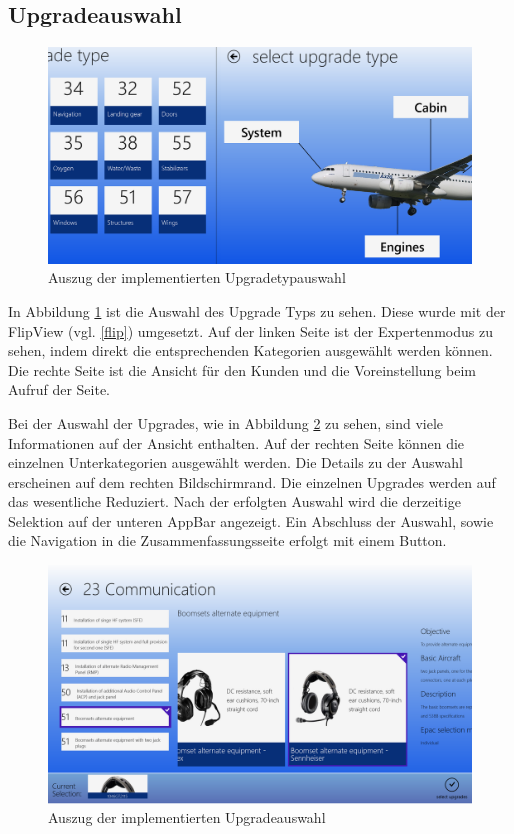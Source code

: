 \subsection{Upgradeauswahl}
\begin{figure}[H]
\centering
\includegraphics[width=\hsize]{images/impl/select_upgrade_type_impl}
\caption{Auszug der implementierten Upgradetypauswahl}
\label{upgradeTypeSelectionImpl}
\end{figure}
In Abbildung \ref{upgradeTypeSelectionImpl} ist die Auswahl des Upgrade Typs zu sehen. Diese wurde mit der FlipView (vgl. \ref{flip}) umgesetzt. Auf der linken Seite ist der Expertenmodus zu sehen, indem direkt die entsprechenden Kategorien ausgewählt werden können. Die rechte Seite ist die Ansicht für den Kunden und die Voreinstellung beim Aufruf der Seite.


Bei der Auswahl der Upgrades, wie in Abbildung \ref{upgradeSelectionImpl} zu sehen, sind viele Informationen auf der Ansicht enthalten. Auf der rechten Seite können die einzelnen Unterkategorien ausgewählt werden. Die Details zu der Auswahl erscheinen auf dem rechten Bildschirmrand. Die einzelnen Upgrades werden auf das wesentliche Reduziert. Nach der erfolgten Auswahl wird die derzeitige Selektion auf der unteren AppBar angezeigt. Ein Abschluss der Auswahl, sowie die Navigation in die Zusammenfassungsseite erfolgt mit einem Button. \par 
\begin{figure}[H]
\centering
\includegraphics[width=\hsize]{images/impl/select_upgrade_impl}
\caption{Auszug der implementierten Upgradeauswahl}
\label{upgradeSelectionImpl}
\end{figure}

